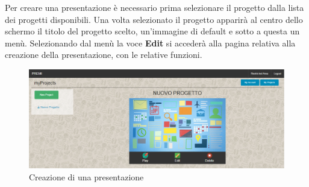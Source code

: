 Per creare una presentazione è necessario prima selezionare il progetto dalla lista dei progetti disponibili. Una volta selezionato il progetto apparirà al centro dello schermo il titolo del progetto scelto, un'immagine di default e sotto a questa un menù. Selezionando dal menù la voce \textbf{Edit} si accederà alla pagina relativa alla creazione della presentazione, con le relative funzioni.

\begin{figure}[H] 
	\centering 
	\includegraphics[scale=0.40] {img/presentazione.png}
	\caption{Creazione di una presentazione} 
\end{figure}